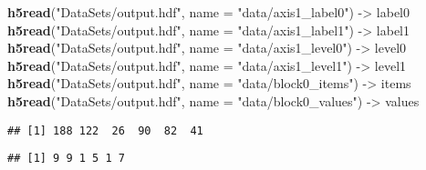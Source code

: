 \documentclass[]{article}
\newenvironment{Shaded}{\begin{snugshade}}{\end{snugshade}}
\newcommand{\DataTypeTok}[1]{\textcolor[rgb]{0.13,0.29,0.53}{#1}}
\newcommand{\KeywordTok}[1]{\textcolor[rgb]{0.13,0.29,0.53}{\textbf{#1}}}
\newcommand{\NormalTok}[1]{#1}
\newcommand{\OperatorTok}[1]{\textcolor[rgb]{0.81,0.36,0.00}{\textbf{#1}}}
\newcommand{\StringTok}[1]{\textcolor[rgb]{0.31,0.60,0.02}{#1}}
\begin{document}
\begin{Shaded}
\begin{Highlighting}[]
\KeywordTok{h5read}\NormalTok{(}\StringTok{"DataSets/output.hdf"}\NormalTok{, }\DataTypeTok{name =} \StringTok{"data/axis1_label0"}\NormalTok{)  ->}\StringTok{ }\NormalTok{label0}
\KeywordTok{h5read}\NormalTok{(}\StringTok{"DataSets/output.hdf"}\NormalTok{, }\DataTypeTok{name =} \StringTok{"data/axis1_label1"}\NormalTok{)  ->}\StringTok{ }\NormalTok{label1}
\KeywordTok{h5read}\NormalTok{(}\StringTok{"DataSets/output.hdf"}\NormalTok{, }\DataTypeTok{name =} \StringTok{"data/axis1_level0"}\NormalTok{)  ->}\StringTok{ }\NormalTok{level0}
\KeywordTok{h5read}\NormalTok{(}\StringTok{"DataSets/output.hdf"}\NormalTok{, }\DataTypeTok{name =} \StringTok{"data/axis1_level1"}\NormalTok{)  ->}\StringTok{ }\NormalTok{level1}
\KeywordTok{h5read}\NormalTok{(}\StringTok{"DataSets/output.hdf"}\NormalTok{, }\DataTypeTok{name =} \StringTok{"data/block0_items"}\NormalTok{)  ->}\StringTok{ }\NormalTok{items}
\KeywordTok{h5read}\NormalTok{(}\StringTok{"DataSets/output.hdf"}\NormalTok{, }\DataTypeTok{name =} \StringTok{"data/block0_values"}\NormalTok{) ->}\StringTok{ }\NormalTok{values}
\end{Highlighting}
\end{Shaded}

\begin{Shaded}
\end{Shaded}

\begin{verbatim}
## [1] 188 122  26  90  82  41
\end{verbatim}

\begin{Shaded}
\end{Shaded}

\begin{verbatim}
## [1] 9 9 1 5 1 7
\end{verbatim}

\begin{Shaded}
\end{Shaded}
\end{document}
